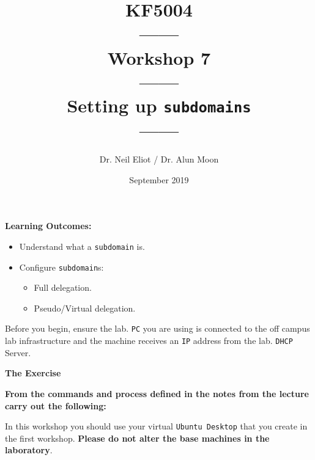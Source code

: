 \documentclass[11pt]{article}
\begin{document}
\author{Dr. Neil Eliot / Dr. Alun Moon}
\title{KF5004\\------\\Workshop 7\\------\\Setting up \texttt{subdomains}\\------}
\date{September 2019}
\maketitle

\newpage



\noindent\textbf{Learning Outcomes:}
\begin{itemize}
    \item Understand what a \texttt{subdomain} is.
    \item Configure \texttt{subdomain}s:
        \begin{itemize}
            \item Full delegation.
            \item Pseudo/Virtual delegation.
        \end{itemize}
\end{itemize}


\begin{tcolorbox}[title={\textbf{Important:}}]
    Before you begin, ensure the lab. \texttt{PC} you are using is connected to the off campus lab infrastructure and the machine receives an \texttt{IP} address from the lab. \texttt{DHCP} Server.
\end{tcolorbox}
\newpage

\noindent\textbf{The Exercise}\\
\begin{tcolorbox}[colback=blue!20]
    \noindent\textbf{From the commands and process defined in the notes from the lecture carry out the following:}
\end{tcolorbox}


\begin{tcolorbox}[title={\textbf{NOTE:}}]
    In this workshop you should use your virtual \texttt{Ubuntu Desktop} that you create in the first workshop. \textbf{Please do not alter the base machines in the laboratory}.
\end{tcolorbox}
\end{document}
